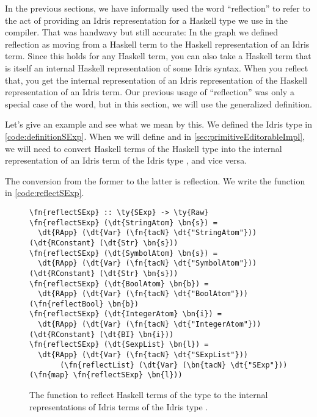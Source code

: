 In the previous sections, we have informally used the word ``reflection'' to
refer to the act of providing an Idris representation for a Haskell type we use
in the compiler.  That was handwavy but still accurate: In the graph we defined
reflection as moving from a Haskell term to the Haskell representation of an
Idris term. Since this holds for any Haskell term, you can also take a Haskell
term that is itself an internal Haskell representation of some Idris syntax.
When you reflect that, you get the internal representation of an Idris
representation of the Haskell representation of an Idris term.  Our previous
usage of ``reflection'' was only a special case of the word, but in this
section, we will use the generalized definition.

Let's give an example and see what we mean by this.
We defined the Idris type  in \autoref{code:definitionSExp}.
When we will define  and  in \autoref{sec:primitiveEditorableImpl},
we will need to convert Haskell terms of the Haskell type  into the
internal representation of an Idris term of the Idris type , and vice
versa.

The conversion from the former to the latter is reflection. We write the
function  in \autoref{code:reflectSExp}.

\begin{figure}[ht]
\caption{The function to reflect Haskell terms of the type  to the
internal representations of Idris terms of the Idris type .}
\label{code:reflectSExp}
\begin{Verbatim}[framesep=2mm, label=\footnotesize{\normalfont{Haskell}}, labelposition=topline]
\fn{reflectSExp} :: \ty{SExp} -> \ty{Raw}
\fn{reflectSExp} (\dt{StringAtom} \bn{s}) =
  \dt{RApp} (\dt{Var} (\fn{tacN} \dt{"StringAtom"})) (\dt{RConstant} (\dt{Str} \bn{s}))
\fn{reflectSExp} (\dt{SymbolAtom} \bn{s}) =
  \dt{RApp} (\dt{Var} (\fn{tacN} \dt{"SymbolAtom"})) (\dt{RConstant} (\dt{Str} \bn{s}))
\fn{reflectSExp} (\dt{BoolAtom} \bn{b}) =
  \dt{RApp} (\dt{Var} (\fn{tacN} \dt{"BoolAtom"})) (\fn{reflectBool} \bn{b})
\fn{reflectSExp} (\dt{IntegerAtom} \bn{i}) =
  \dt{RApp} (\dt{Var} (\fn{tacN} \dt{"IntegerAtom"})) (\dt{RConstant} (\dt{BI} \bn{i}))
\fn{reflectSExp} (\dt{SexpList} \bn{l}) =
  \dt{RApp} (\dt{Var} (\fn{tacN} \dt{"SExpList"}))
       (\fn{reflectList} (\dt{Var} (\bn{tacN} \dt{"SExp"})) (\fn{map} \fn{reflectSExp} \bn{l}))
\end{Verbatim}
\end{figure}

